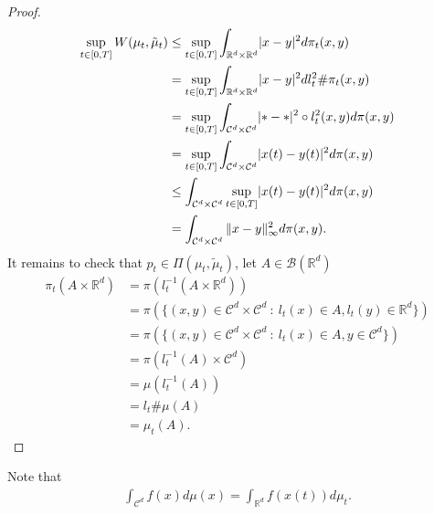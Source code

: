 \begin{proof}
  \begin{align*}
    \sup_{t \in  [0,T]} W(\mu_t,\tilde{\mu }_t ) &\le \sup_{t \in  [0,T]} \int_{\mathbb{R}^{d} \times  \mathbb{R}^{d} } \lvert x-y\rvert^2 d \pi_t(x,y)\\
                                                 &= \sup_{t \in  [0,T]} \int_{\mathbb{R}^{d} \times  \mathbb{R}^{d} } \lvert x-y\rvert^2 d l_t^2 \# \pi_t(x,y)\\
                                                 &= \sup_{t \in  [0,T]} \int_{\mathcal{C}^{d}  \times  \mathcal{C}^{d} } \lvert* - *\rvert^2 \circ l^2_t(x,y) d\pi(x,y) \\
                                                 &= \sup_{t \in  [0,T]} \int_{\mathcal{C}^{d} \times \mathcal{C}^{d}   } \lvert x(t)-y(t)\rvert^2 d\pi(x,y)\\
                                                 &\le  \int_{\mathcal{C}^{d} \times  \mathcal{C}^{d}  } \sup_{t \in  [0,T]} \lvert x(t)-y(t)\rvert^2 d\pi(x,y) \\
                                                 &= \int_{\mathcal{C}^{d} \times  \mathcal{C}^{d}  } \|x-y\|_\infty ^2 d\pi(x,y)
  .\end{align*}
  It remains to check that $p_t \in  \Pi(\mu_t,\tilde{\mu}_t )$, let $A \in  \mathcal{B}(\mathbb{R}^{d} )$
  \begin{align*}
    \pi_t(A \times  \mathbb{R}^{d} ) &= \pi (l_t^{-1}(A \times  \mathbb{R}^{d} )) \\
                                     &= \pi(\{(x,y) \in  \mathcal{C}^{d} \times  \mathcal{C}^{d} \ : \ l_t(x) \in  A, l_t(y) \in  \mathbb{R}^{d}   \}  )\\
                                     &=\pi (\{(x,y) \in  \mathcal{C}^{d} \times  \mathcal{C}^{d} \ : \ l_t(x) \in  A  , y \in  \mathcal{C}^{d}  \}  ) \\
                                     &= \pi(l_t^{-1}(A) \times \mathcal{C}^{d} )\\
                                     &= \mu(l_t^{-1}(A)) \\
                                     &= l_t \# \mu(A)\\
                                     &= \mu_t(A)
  .\end{align*}
\end{proof}
\begin{remark}
 Note that
 \begin{align*}
   \int_{\mathcal{C}^{d} } f(x) d\mu(x) = \int_{\mathbb{R}^{d} }  f(x(t)) d\mu_t
 .\end{align*}
\end{remark}

